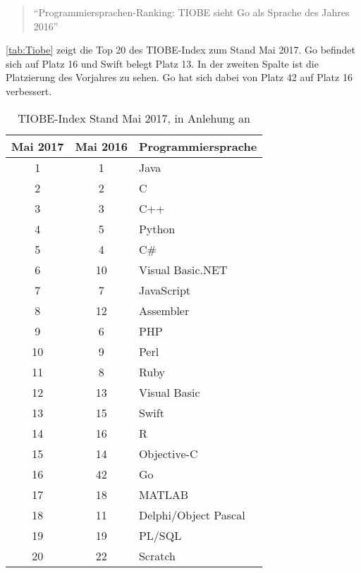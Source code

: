 \begin{quote}
\enquote{Programmiersprachen-Ranking: TIOBE sieht Go als Sprache des Jahres 2016}\cite{MengeSonnentag}
\end{quote}

\autoref{tab:Tiobe} zeigt die Top 20 des TIOBE-Index zum Stand Mai 2017. 
Go befindet sich auf Platz 16 und Swift belegt Platz 13. 
In der zweiten Spalte ist die Platzierung des Vorjahres zu sehen. 
Go hat sich dabei von Platz 42 auf Platz 16 verbessert.

\begin{table}[H]
    \centering
    \begin{tabularx}{\textwidth}{|c|c|X|}
    \hline 
    \rowcolor[gray]{0.75} \textbf{Mai 2017} & \textbf{Mai 2016} & \textbf{Programmiersprache} \\
    \hline
    1 & 1 & Java \\
    \hline
    2 & 2 & C \\
    \hline
    3 & 3 & C++ \\
    \hline
    4 & 5 & Python \\
    \hline
    5 & 4 & C\# \\
    \hline
    6 & 10 & Visual Basic.NET \\
    \hline
    7 & 7 & JavaScript \\
    \hline
    8 & 12 & Assembler \\
    \hline
    9 & 6 & PHP \\
    \hline
    10 & 9 & Perl \\
    \hline
    11 & 8 & Ruby \\
    \hline
    12 & 13 & Visual Basic \\
    \hline
    13 & 15 & Swift \\
    \hline
    14 & 16 & R \\
    \hline
    15 & 14 & Objective-C \\
    \hline
    16 & 42 & Go \\
    \hline
    17 & 18 & MATLAB \\	
    \hline
    18 & 11 & Delphi/Object Pascal \\	
    \hline
    19 & 19 & PL/SQL \\	
    \hline
    20 & 22 & Scratch \\	
    \hline
    \end{tabularx}
    \caption{TIOBE-Index Stand Mai 2017, in Anlehung an \cite{Tiobe}}
    \label{tab:Tiobe}
\end{table}


